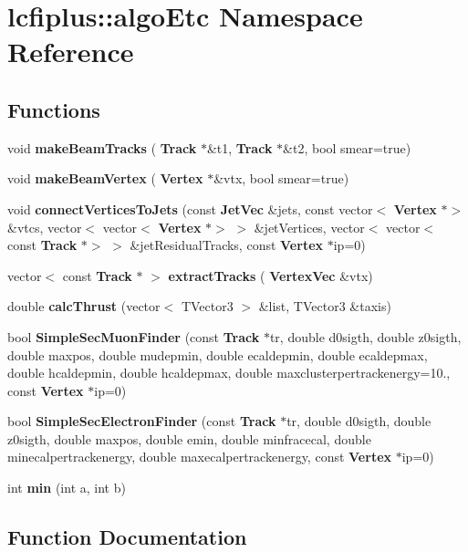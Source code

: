 \section{lcfiplus\+:\+:algo\+Etc Namespace Reference}
\label{namespacelcfiplus_1_1algoEtc}
\subsection*{Functions}
\begin{DoxyCompactItemize}
\item 
void \textbf{ make\+Beam\+Tracks} (\textbf{ Track} $\ast$\&t1, \textbf{ Track} $\ast$\&t2, bool smear=true)
\item 
void \textbf{ make\+Beam\+Vertex} (\textbf{ Vertex} $\ast$\&vtx, bool smear=true)
\item 
void \textbf{ connect\+Vertices\+To\+Jets} (const \textbf{ Jet\+Vec} \&jets, const vector$<$ \textbf{ Vertex} $\ast$$>$ \&vtcs, vector$<$ vector$<$ \textbf{ Vertex} $\ast$$>$ $>$ \&jet\+Vertices, vector$<$ vector$<$ const \textbf{ Track} $\ast$$>$ $>$ \&jet\+Residual\+Tracks, const \textbf{ Vertex} $\ast$ip=0)
\item 
vector$<$ const \textbf{ Track} $\ast$ $>$ \textbf{ extract\+Tracks} (\textbf{ Vertex\+Vec} \&vtx)
\item 
double \textbf{ calc\+Thrust} (vector$<$ T\+Vector3 $>$ \&list, T\+Vector3 \&taxis)
\item 
bool \textbf{ Simple\+Sec\+Muon\+Finder} (const \textbf{ Track} $\ast$tr, double d0sigth, double z0sigth, double maxpos, double mudepmin, double ecaldepmin, double ecaldepmax, double hcaldepmin, double hcaldepmax, double maxclusterpertrackenergy=10., const \textbf{ Vertex} $\ast$ip=0)
\item 
bool \textbf{ Simple\+Sec\+Electron\+Finder} (const \textbf{ Track} $\ast$tr, double d0sigth, double z0sigth, double maxpos, double emin, double minfracecal, double minecalpertrackenergy, double maxecalpertrackenergy, const \textbf{ Vertex} $\ast$ip=0)
\item 
int \textbf{ min} (int a, int b)
\end{DoxyCompactItemize}


\subsection{Function Documentation}
\mbox{\label{namespacelcfiplus_1_1algoEtc_a0ef5e0af0d59d32c2ebdd05a99128eb6}} 
